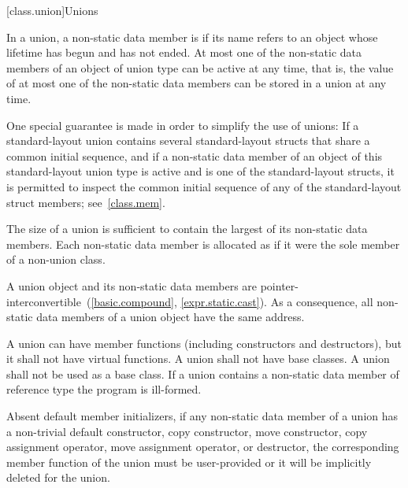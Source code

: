 [class.union]{Unions}%

\pnum
In a union,
a non-static data member is 
if its name refers to an object
whose lifetime has begun and has not ended.
At most one of the non-static data members of an object of union type
can be active at any
time, that is, the value of at most one of the non-static data members can be
stored in a union at any time.
\begin{note}
One special guarantee is made in order to
simplify the use of unions: If a standard-layout union contains several standard-layout
structs that share a common initial sequence, and
if a non-static data member of an object of this standard-layout union type
is active and is one of the standard-layout structs,
it is permitted to inspect the common initial sequence
of any of the standard-layout struct members;
see~\ref{class.mem}.
\end{note}

\pnum
The size of a union is sufficient to contain the largest
of its non-static data members. Each non-static data member is allocated
as if it were the sole member of a non-union class.
\begin{note}
A union object and its non-static data members are
pointer-interconvertible~(\ref{basic.compound}, \ref{expr.static.cast}).
As a consequence, all non-static data members of a
union object have the same address.
\end{note}

\pnum
{}%
%
%
A union can have member functions (including constructors and destructors),
%
but it shall not have virtual functions. A union shall not have
base classes. A union shall not be used as a base class.
%
If a union contains a non-static data member of
reference type the program is ill-formed.
\begin{note}
Absent default member initializers,
if any non-static data member of a union has a non-trivial
default constructor,
copy constructor, move constructor,
copy assignment operator, move assignment operator,
or destructor, the corresponding member function
of the union must be user-provided or it will
be implicitly deleted for the union.
\end{note}

